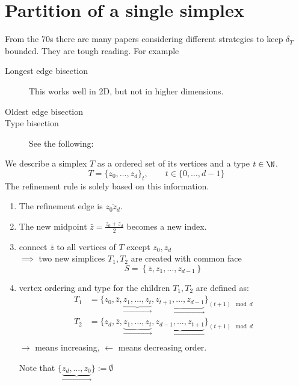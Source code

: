 \section{Partition of a single simplex}
From the 70s there are many papers considering different strategies to keep $\delta_T$ bounded. They are tough reading. For example
\begin{description}
  \item[Longest edge bisection] This works well in 2D, but not in higher dimensions.
  \item[Oldest edge bisection]
  \item[Type bisection] See the following:
\end{description}
\begin{definition}
	We describe a simplex $T$ as a ordered set of its vertices and a type $t\in \N$.
	\begin{equation*}
    T = \{z_{0}, \dots , z_{d}\}_{t}, \qquad t\in \{0,\dots ,d-1\}
	\end{equation*}
	The refinement rule is solely based on this information.
	\begin{enumerate}[label = \arabic*)]
		\item The refinement edge is $\overline{z_{0}z_{d}}$.
		\item The new midpoint $\bar{z}= \frac{z_{0} + z_{d}}{2}$ becomes a new index.
		\item connect $\bar{z}$ to all vertices of $T$ except $z_{0},z_{d}$ \\
			$\implies$ two new simplices $T_{1},T_{2}$ are created with common face
			 \begin{equation*}
         S = \left\{\overline{z},z_{1},\dots ,z_{d-1} \right\}
     \end{equation*}
		\item vertex ordering and type for the children $T_{1},T_{2}$ are defined as:
			\begin{align*}
        T_{1}&= \{ z_{0},\overline{z},\underbrace{z_{1},\dots ,z_{t}}_{\rightarrow},\underbrace{z_{t+1},\dots ,z_{d-1}}_{{\rightarrow}}\}_{(t+1)\mod d}\\
				T_{2}&= \{ z_{d},\overline{z},\underbrace{z_{1},\dots ,z_{t}}_{\rightarrow},\underbrace{z_{d-1},\dots ,z_{t+1}}_{{\leftarrow}}\}_{(t+1)\mod d}\\
			\end{align*}
		$\rightarrow$ means increasing, $\leftarrow$ means decreasing order.

    Note that $\{\underbrace{z_{d},\dots ,z_{0}}_{\rightarrow}\} := \emptyset$
	\end{enumerate}
\end{definition}
